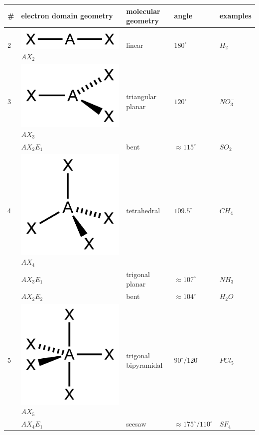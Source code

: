 \documentclass[ wastespaceontitle, english]{cheat_sheet_template}
\begin{document}
\setlength\tabcolsep{2pt}
\begin{longtable}{lllll}
    \hline
    \#& electron domain geometry & molecular geometry & angle & examples \\
    \hline
            2& 
            \centering
                 \includegraphics[width = 0.2\linewidth]{edomaingeo/AX2E0-2D.png} 
                 $AX_2$
                  & linear & $180^\circ$ & $H_2$ \\
            \hline
            3&  \centering
                 \includegraphics[width = 0.2\linewidth]{edomaingeo/AX3E0-side-2D.png} 
                 $AX_3$
                  & triangular planar & $120^\circ$ & $NO_3^-$ \\
            &  \centering
                 $AX_2E_1$
                  & bent & $\approx 115^\circ$ & $SO_2$ \\
         
            \hline
            4&  \centering
                 \includegraphics[width = 0.2\linewidth]{edomaingeo/AX4E0-2D.png} 
                 $AX_4$
                  & tetrahedral &  $109.5^\circ$ & $CH_4$ \\
            &  \centering
                 $AX_3E_1$
                  & trigonal planar & $\approx 107^\circ$ & $NH_3$ \\
            &  \centering
                 $AX_2E_2$
                  & bent & $\approx 104^\circ$ & $H_2O$  \\
             \hline
            5&  \centering
                 \includegraphics[width = 0.2\linewidth]{edomaingeo/AX5E0-2D.png} 
                 $AX_5$
                  & trigonal bipyramidal & $90^\circ/ 120^\circ$& $PCl_5$ \\
            &  \centering
                 $AX_4E_1$
                  & seesaw & $\approx 175^\circ/ 110^\circ$ & $SF_4$  \\
       

\end{longtable}
\end{document}
